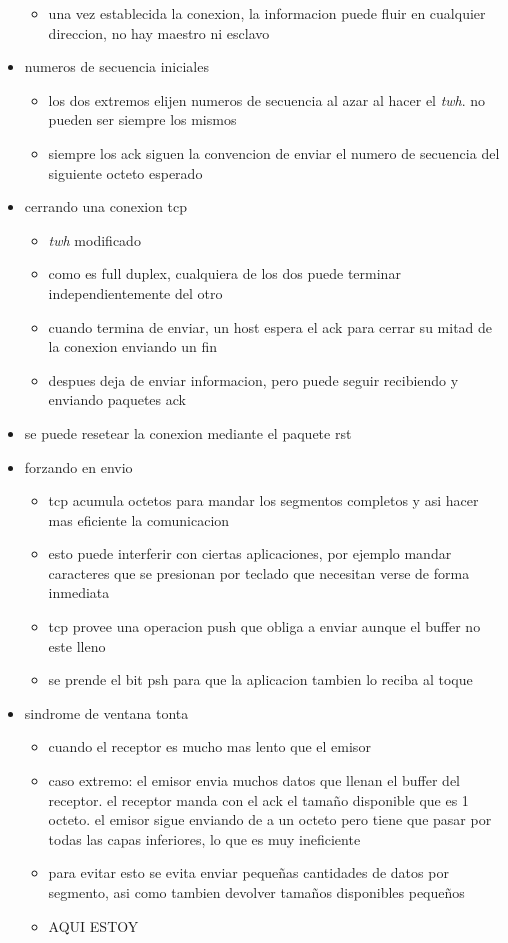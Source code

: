 \documentclass[11pt]{article}
\begin{document}
\begin{itemize}
\begin{itemize}
\item una vez establecida la conexion, la informacion puede fluir en cualquier direccion, no hay maestro ni esclavo
\end{itemize}
\item numeros de secuencia iniciales
\begin{itemize}
\item los dos extremos elijen numeros de secuencia al azar al hacer el \emph{twh}. no pueden ser siempre los mismos
\item siempre los ack siguen la convencion de enviar el numero de secuencia del siguiente octeto esperado
\end{itemize}
\item cerrando una conexion tcp
\begin{itemize}
\item \emph{twh} modificado
\item como es full duplex, cualquiera de los dos puede terminar independientemente del otro
\item cuando termina de enviar, un host espera el ack para cerrar su mitad de la conexion enviando un fin
\item despues deja de enviar informacion, pero puede seguir recibiendo y enviando paquetes ack
\end{itemize}
\item se puede resetear la conexion mediante el paquete rst
\item forzando en envio
\begin{itemize}
\item tcp acumula octetos para mandar los segmentos completos y asi hacer mas eficiente la comunicacion
\item esto puede interferir con ciertas aplicaciones, por ejemplo mandar caracteres que se presionan por teclado que necesitan verse de forma inmediata
\item tcp provee una operacion push que obliga a enviar aunque el buffer no este lleno
\item se prende el bit psh para que la aplicacion tambien lo reciba al toque
\end{itemize}
\item sindrome de ventana tonta
\begin{itemize}
\item cuando el receptor es mucho mas lento que el emisor
\item caso extremo: el emisor envia muchos datos que llenan el buffer del receptor. el receptor manda con el ack el tamaño disponible que es 1 octeto. el emisor sigue enviando de a un octeto pero tiene que pasar por todas las capas inferiores, lo que es muy ineficiente
\item para evitar esto se evita enviar pequeñas cantidades de datos por segmento, asi como tambien devolver tamaños disponibles pequeños
\item AQUI ESTOY
\end{itemize}
\end{itemize}
\end{document}
